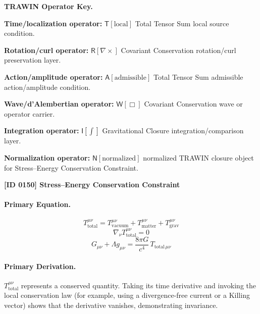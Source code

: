 \par\vspace{0.45\baselineskip}
\noindent\begin{minipage}[t]{\linewidth}
\begingroup
\small
\raggedright
\textbf{TRAWIN Operator Key.}\par
\noindent\textbf{Time/localization operator:} $\mathsf{T}\!\left[\mathrm{local}\right]$ Total Tensor Sum local source condition.\par
\noindent\textbf{Rotation/curl operator:} $\mathsf{R}\!\left[\nabla\times\right]$ Covariant Conservation rotation/curl preservation layer.\par
\noindent\textbf{Action/amplitude operator:} $\mathsf{A}\!\left[\mathrm{admissible}\right]$ Total Tensor Sum admissible action/amplitude condition.\par
\noindent\textbf{Wave/d'Alembertian operator:} $\mathsf{W}\!\left[\Box\right]$ Covariant Conservation wave or operator carrier.\par
\noindent\textbf{Integration operator:} $\mathsf{I}\!\left[\int\right]$ Gravitational Closure integration/comparison layer.\par
\noindent\textbf{Normalization operator:} $\mathsf{N}\!\left[\mathrm{normalized}\right]$ normalized TRAWIN closure object for Stress--Energy Conservation Constraint.\par
\endgroup
\end{minipage}

\clearpage
\noindent\textbf{[ID 0150] Stress--Energy Conservation Constraint}\par
\vspace{0.35em}
\paragraph{Primary Equation.}
\[
T_{\mathrm{total}}^{\mu\nu}
=
T_{\mathrm{vacuum}}^{\mu\nu}
+T_{\mathrm{matter}}^{\mu\nu}
+T_{\mathrm{grav}}^{\mu\nu}
\]
\[
\nabla_{\nu}T_{\mathrm{total}}^{\mu\nu}=0
\]
\[
G_{\mu\nu}+\Lambda g_{\mu\nu}
=
\frac{8\pi G}{c^4}\,T_{\mathrm{total}\,\mu\nu}
\]

\paragraph{Primary Derivation.}
\( T_{\mathrm{total}}^{\mu\nu} \) represents a conserved quantity. Taking its time derivative and invoking the local conservation law (for example, using a divergence-free current or a Killing vector) shows that the derivative vanishes, demonstrating invariance.
